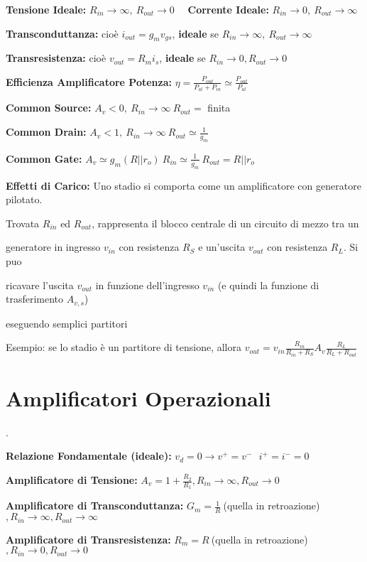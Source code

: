 \documentclass[12pt]{extarticle}
\begin{document}
{\bf Tensione Ideale:} $R_{in} \to \infty, \ R_{out} \to 0 $ \ \ {\bf Corrente Ideale:} $R_{in} \to 0, \ R_{out} \to \infty $ 

{\bf Transconduttanza:} cioè $ i_{out} = g_mv_{gs} $, {\bf ideale} se $R_{in} \to \infty, \ R_{out} \to \infty$

{\bf Transresistenza:} cioè $ v_{out} = R_mi_s$, {\bf ideale} se $R_{in} \to 0, R_{out} \to 0$ 

{\bf Efficienza Amplificatore Potenza:} $\displaystyle \eta = \frac{P_{out}}{P_{al}+P_{in}} \simeq \frac{P_{out}}{P_{al}}$ 

{\bf Common Source:} $ A_v < 0, \ R_{in} \to \infty \ R_{out} = $ finita 

{\bf Common Drain:} $ A_v < 1, \ R_{in} \to \infty \ R_{out} \simeq \frac{1}{g_m}$	

{\bf Common Gate:} $ A_v \simeq g_m(R || r_o) \ R_{in} \simeq \frac{1}{g_m} \ R_{out} = R || r_o$

{\bf Effetti di Carico:} Uno stadio si comporta come un amplificatore con generatore pilotato.

Trovata $R_{in}$ ed $R_{out}$, rappresenta il blocco centrale di un circuito di mezzo tra un 

generatore in ingresso $v_{in}$ con resistenza $R_S$ e un'uscita $v_{out}$ con resistenza $R_L$. Si puo

ricavare l'uscita $v_{out}$ in funzione dell'ingresso $v_{in}$ (e quindi la funzione di trasferimento $A_{v,s}$)

eseguendo semplici partitori 

Esempio: se lo stadio è un partitore di tensione, allora $\displaystyle v_{out} = v_{in}\frac{R_{in}}{R_{in}+R_S}A_v\frac{R_L}{R_L+R_{out}}$


\section{Amplificatori Operazionali}.

{\bf Relazione Fondamentale (ideale):} $\displaystyle v_d = 0 \to v^+ = v^- \ \ \ i^+ = i^- = 0$

{\bf Amplificatore di Tensione:} $\displaystyle A_v = 1+\frac{R_2}{R_1}, R_{in} \to \infty, R_{out} \to 0$

{\bf Amplificatore di Transconduttanza:} $\displaystyle G_m = \frac{1}{R} \ $(quella in retroazione)$, R_{in} \to \infty, R_{out} \to \infty$

{\bf Amplificatore di Transresistenza: } $\displaystyle R_m = R \ $(quella in retroazione)$, R_{in} \to 0, R_{out} \to 0$
\end{document}
